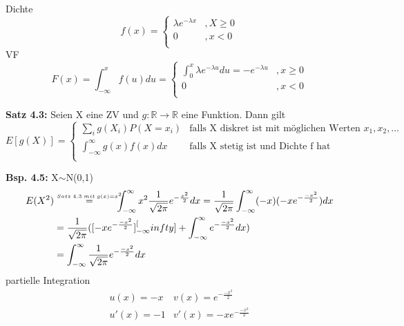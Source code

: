 \documentclass[a4paper,11pt]{article}
\newcommand\sfothree{\overset{\mathclap{\scriptscriptstyle Satz \hspace{2pt} 4.3 \hspace{2pt} mit \hspace{2pt} g(x)=x^2}}{=}}
\begin{document}
\vspace{6pt}
\noindent Dichte
\begin{equation*}
f(x)=\begin{cases}
\lambda e^{-\lambda x} &, X\geq0\\
0 &, x<0\\
\end{cases}
\end{equation*}
\newline VF
\begin{equation*}
F(x)=\int_{-\infty}^{x}f(u)du = \begin{cases}
\int_{0}^{x}\lambda e^{-\lambda u}du = -e^{-\lambda u} &, x\geq0\\
0 &, x<0\\
\end{cases}
\end{equation*}






\vspace{6pt}
\noindent\textbf{Satz 4.3:} Seien X eine ZV und $g:\mathbb{R}\rightarrow\mathbb{R}$ eine Funktion. Dann gilt
\begin{equation*}
E[g(X)] = \begin{cases}
\sum_{i}^{}g(X_i)P(X=x_i) & \text{falls X diskret ist mit möglichen Werten  } x_1,x_2,\dots\\
\int_{-\infty}^{\infty}g(x)f(x)dx & \text{falls X stetig ist und Dichte f hat}\\
\end{cases}
\end{equation*}

\vspace{6pt}
\noindent\textbf{Bsp. 4.5:} X$\sim$N(0,1)
\begin{align*}
E(X^2) &\hspace{30pt}\sfothree\hspace{22pt} \int_{-\infty}^{\infty}x^2\frac{1}{\sqrt{2\pi}}e^{-\frac{x^2}{2}}dx = \frac{1}{\sqrt{2\pi}}\int_{-\infty}^{\infty}(-x)(-xe^{-\frac{-x^2}{2}})dx\\
&= \frac{1}{\sqrt{2\pi}}([-xe^{-\frac{-x^2}{2}}]_{-\infty}^[infty]+\int_{-\infty}^{\infty}e^{-\frac{-x^2}{2}}dx)\\
&= \int_{-\infty}^{\infty}\frac{1}{\sqrt{2\pi}}e^{-\frac{-x^2}{2}}dx
\end{align*} %
\newline partielle Integration
\begin{align*}
u(x)=-x & v(x) = e^{-\frac{-x^2}{2}}\\
u'(x)=-1 & v'(x) = -xe^{-\frac{-x^2}{2}}\\
\end{align*}
\end{document}
